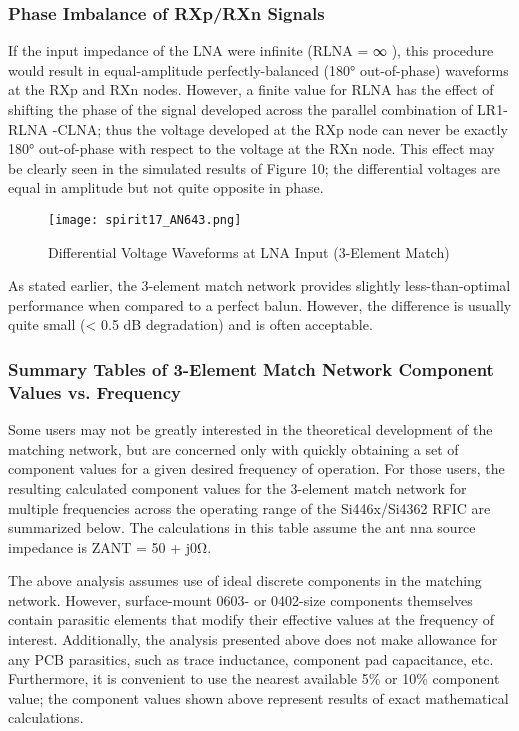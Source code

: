       \subsubsection{Phase Imbalance of RXp/RXn Signals}
        If the input impedance of the LNA were infinite (RLNA = ∞ ), this procedure would result in 
        equal-amplitude perfectly-balanced (180° out-of-phase) waveforms at the RXp and RXn nodes. However, a 
        finite value for RLNA has the effect of shifting the phase of the signal developed across the 
        parallel combination of LR1- RLNA -CLNA; thus the voltage developed at the RXp node can never be 
        exactly 180° out-of-phase with respect to the voltage at the RXn node. This effect may be clearly 
        seen in the simulated results of Figure 10; the differential voltages are equal in amplitude but not 
        quite opposite in phase.
        \begin{figure}[ht!] %
          \centering
          \texttt{[image: spirit17\_AN643.png]}
          \caption{Differential Voltage Waveforms at LNA Input (3-Element Match)}
          \label{EXP001:fig_spirit17}
        \end{figure}
        
        As stated earlier, the 3-element match network provides slightly less-than-optimal performance when 
        compared to a perfect balun. However, the difference is usually quite small (< 0.5 dB degradation) 
        and is often acceptable. 
        
      \subsubsection{Summary Tables of 3-Element Match Network Component Values vs. Frequency}
        Some users may not be greatly interested in the theoretical development of the matching network, but 
        are concerned only with quickly obtaining a set of component values for a given desired frequency of 
        operation. For those users, the resulting calculated component values for the 3-element match network 
        for multiple frequencies across the operating range of the Si446x/Si4362 RFIC are summarized below. 
        The calculations in this table assume the ant nna source impedance is ZANT = 50 + j0Ω.
        
        The above analysis assumes use of ideal discrete components in the matching network. However, 
        surface-mount 0603- or 0402-size components themselves contain parasitic elements that modify their 
        effective values at the  frequency of interest. Additionally, the analysis presented above does not 
        make allowance for any PCB parasitics, such as trace inductance, component pad capacitance, etc. 
        Furthermore, it is convenient to use the nearest available 5\% or 10\% component value; the component 
        values shown above represent results of exact mathematical calculations.
        
